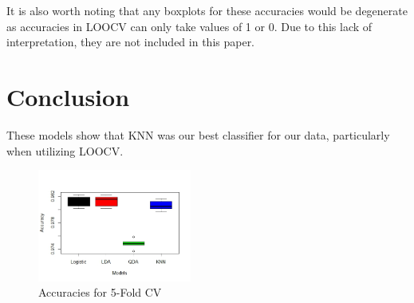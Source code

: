 \documentclass[10pt,twocolumn,letterpaper]{article}
\begin{document}
It is also worth noting that any boxplots for these accuracies would be degenerate as accuracies in LOOCV can only take values of 1 or 0. Due to this lack of interpretation, they are not included in this paper.

\section{Conclusion}
These models show that KNN was our best classifier for our data, particularly when utilizing LOOCV. 


\begin{figure}
	\includegraphics[width=0.45\textwidth]{images/5Fold.jpeg}
	\caption{Accuracies for 5-Fold CV}
	\label{fig:5f}
\end{figure}
\end{document}
